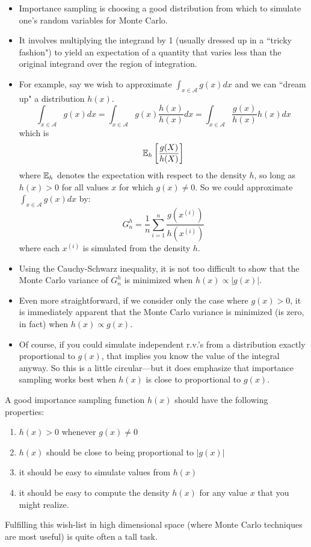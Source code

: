 \begin{itemize}
\item Importance sampling is choosing a good
distribution from which to simulate one's random variables for Monte Carlo.
\item It involves
multiplying the integrand by 1 (usually dressed up in a ``tricky
fashion") to yield an expectation of a quantity that varies less than the
original integrand over the region of integration.

\item For example, say we wish to approximate $\int_{x\in\mathcal A}g(x)dx$ and we can ``dream up" a distribution $h(x)$.
\[
\int_{x\in\mathcal A}g(x)dx = \int_{x\in\mathcal A}g(x)\frac{h(x)}{h(x)}dx 
= \int_{x\in\mathcal A}\frac{g(x)}{h(x)}h(x)dx
\]
which is
\[
\Bbb{E}_h\left[\frac{g(X)}{h(X)}\right]
\]
where $\Bbb{E}_h$ denotes the expectation with respect to the density $h$, so long as $h(x)>0$ for all values $x$ for which $g(x)\neq 0$.
\newpage
So we could approximate $\int_{x\in\mathcal A}g(x)dx$ by:
\[
G_n^h = \frac{1}{n} \sum_{i=1}^n  \frac{g(x^{(i)})}{h(x^{(i)})}
\]
where each $x^{(i)}$ is simulated from the density $h$. 

\item Using the Cauchy-Schwarz inequality, it is not too difficult to show that the Monte Carlo variance of $G_n^h$ is minimized when $h(x)\propto |g(x)|$.

\item Even more straightforward, if we consider only the case where $g(x)>0$, it is immediately apparent that the Monte Carlo variance is minimized (is zero, in fact) when $h(x)\propto g(x)$.  

\item Of course, if you could simulate independent r.v.'s from a distribution exactly proportional to $g(x)$, that implies you know the value of the integral anyway. So this is a little circular---but it does emphasize that importance sampling works best when $h(x)$ is close to proportional to $g(x)$. 
\end{itemize}

A good importance sampling function $h(x)$ should have the following
properties:
\begin{enumerate}
\item $h(x) > 0$ whenever $g(x) \neq 0$
\item $h(x)$ should be close to being proportional to $|g(x)|$
\item it should be easy to simulate values from $h(x)$
\item it should be easy to compute the density $h(x)$ for any value $x$ that you
might realize.
\end{enumerate}
Fulfilling this wish-list in high dimensional space (where Monte Carlo techniques
are most useful) is quite often a tall task.

